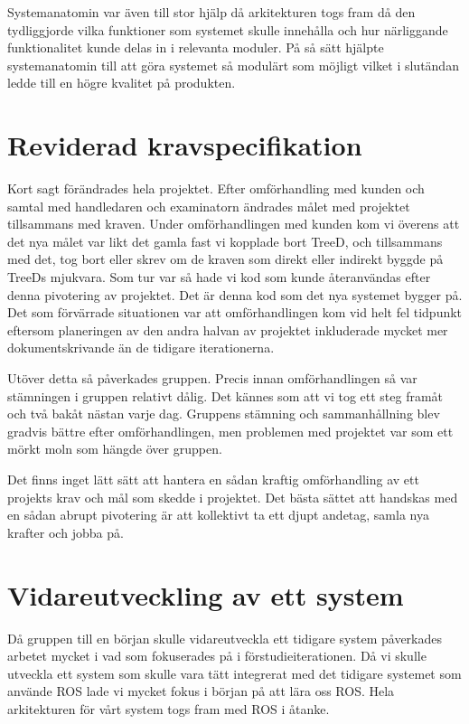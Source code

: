 Systemanatomin var även till stor hjälp då arkitekturen togs fram då den tydliggjorde vilka funktioner som systemet skulle innehålla och hur närliggande funktionalitet kunde delas in i relevanta moduler. På så sätt hjälpte systemanatomin till att göra systemet så modulärt som möjligt vilket i slutändan ledde till en högre kvalitet på produkten.

\section{Reviderad kravspecifikation}
Kort sagt förändrades hela projektet. Efter omförhandling med kunden och samtal med handledaren och examinatorn ändrades målet med projektet tillsammans med kraven. Under omförhandlingen med kunden kom vi överens att det nya målet var likt det gamla fast vi kopplade bort TreeD, och tillsammans med det, tog bort eller skrev om de kraven som direkt eller indirekt byggde på TreeDs mjukvara. Som tur var så hade vi kod som kunde återanvändas efter denna pivotering av projektet. Det är denna kod som det nya systemet bygger på. Det som förvärrade situationen var att omförhandlingen kom vid helt fel tidpunkt eftersom planeringen av den andra halvan av projektet inkluderade mycket mer dokumentskrivande än de tidigare iterationerna.

Utöver detta så påverkades gruppen. Precis innan omförhandlingen så var stämningen i gruppen relativt dålig. Det kännes som att vi tog ett steg framåt och två bakåt nästan varje dag. Gruppens stämning och sammanhållning blev gradvis bättre efter omförhandlingen, men problemen med projektet var som ett mörkt moln som hängde över gruppen.

Det finns inget lätt sätt att hantera en sådan kraftig omförhandling av ett projekts krav och mål som skedde i projektet. Det bästa sättet att handskas med en sådan abrupt pivotering är att kollektivt ta ett djupt andetag, samla nya krafter och jobba på.

\section{Vidareutveckling av ett system}
Då gruppen till en början skulle vidareutveckla ett tidigare system påverkades arbetet mycket i vad som fokuserades på i förstudieiterationen. Då vi skulle utveckla ett system som skulle vara tätt integrerat med det tidigare systemet som använde ROS lade vi mycket fokus i början på att lära oss ROS. Hela arkitekturen för vårt system togs fram med ROS i åtanke.

